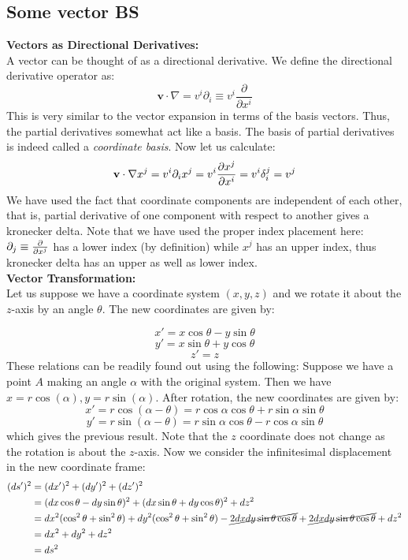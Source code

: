 \subsection{Some vector BS}
\textbf{Vectors as Directional Derivatives:}\\[0.3cm]
A vector can be thought of as a directional derivative. We define the directional derivative operator as:
$$\mathbf{v}\cdot \nabla = v^i \partial_i\equiv  v^i \dfrac{\partial}{\partial x^i}$$
This is very similar to the vector expansion in terms of the basis vectors. Thus, the partial derivatives somewhat act like a basis. The basis of partial derivatives is indeed called a \textit{coordinate basis}. Now let us calculate:
$$\mathbf{v}\cdot \nabla x^j = v^i \partial_i x^j = v^i\pdv{x^j}{x^i} = v^i\tensor*{\delta}{^j_i} = v^j$$
We have used the fact that coordinate components are independent of each other, that is, partial derivative of one component with respect to another gives a kronecker delta. Note that we have used the proper index placement here: $\partial_j\equiv \pdv{x^j}$ has a lower index (by definition) while $x^j$ has an upper index, thus kronecker delta has an upper as well as lower index.\\[0.3cm]
\textbf{Vector Transformation:}\\[0.3cm]
Let us suppose we have a coordinate system $(x,y,z)$ and we rotate it about the $z$-axis by an angle $\theta$. The new coordinates are given by:
\begin{figure}[H]
    \centering 
    
\end{figure}
$$x' = x\cos\theta - y\sin\theta$$
$$y' = x\sin\theta + y\cos\theta$$
$$z' = z$$
These relations can be readily found out using the following: Suppose we have a point $A$ making an angle $\alpha$ with the original system. Then we have $x = r\cos(\alpha), y = r\sin(\alpha)$. After rotation, the new coordinates are given by:
$$x' = r\cos(\alpha - \theta) = r\cos\alpha\cos\theta + r\sin\alpha\sin\theta$$
$$y' = r\sin(\alpha - \theta) = r\sin\alpha\cos\theta - r\cos\alpha\sin\theta$$
which gives the previous result. Note that the $z$ coordinate does not change as the rotation is about the $z$-axis. Now we consider the infinitesimal displacement in the new coordinate frame:
\begin{align*}
    (ds')^2 &= (dx')^2 + (dy')^2 + (dz')^2\\
    &= (dx\cos\theta - dy\sin\theta)^2 + (dx\sin\theta + dy\cos\theta)^2 + dz^2\\
    &= dx^2(\cos^2\theta+\sin^2\theta) + dy^2(\cos^2\theta+\sin^2\theta)- \cancel{2dxdy\sin\theta\cos\theta} +  \cancel{2dxdy\sin\theta\cos\theta} + dz^2\\
    &= dx^2 + dy^2 + dz^2\\
    &= ds^2
\end{align*}
